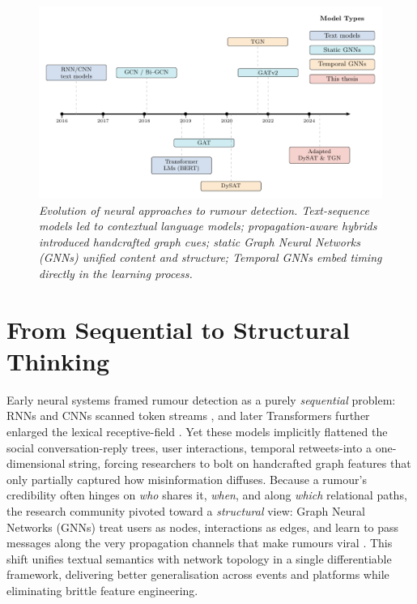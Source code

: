\documentclass{cshonours}
\begin{document}
\begin{figure}[htbp]
  \centering
  \includegraphics[width=\textwidth]{../figures/rumour_timeline.pdf}
  \caption[Evolution of neural approaches to rumour detection]{\textit{Evolution of neural approaches to rumour detection.  Text-sequence models led to contextual language models; propagation-aware hybrids introduced handcrafted graph cues; static Graph Neural Networks (GNNs) unified content and structure; Temporal GNNs embed timing directly in the learning process.}}
  \label{fig:timeline}
\end{figure}

\section{From Sequential to Structural Thinking}

Early neural systems framed rumour detection as a purely \emph{sequential} problem: RNNs and CNNs scanned token streams \cite{yu2017cnn}, and later Transformers further enlarged the lexical receptive-field \cite{rahman2024primer}. Yet these models implicitly flattened the social conversation-reply trees, user interactions, temporal retweets-into a one-dimensional string, forcing researchers to bolt on handcrafted graph features that only partially captured how misinformation diffuses. Because a rumour's credibility often hinges on \emph{who} shares it, \emph{when}, and along \emph{which} relational paths, the research community pivoted toward a \emph{structural} view: Graph Neural Networks (GNNs) treat users as nodes, interactions as edges, and learn to pass messages along the very propagation channels that make rumours viral \cite{bian2020rumor}. This shift unifies textual semantics with network topology in a single differentiable framework, delivering better generalisation across events and platforms while eliminating brittle feature engineering. 
\end{document}
